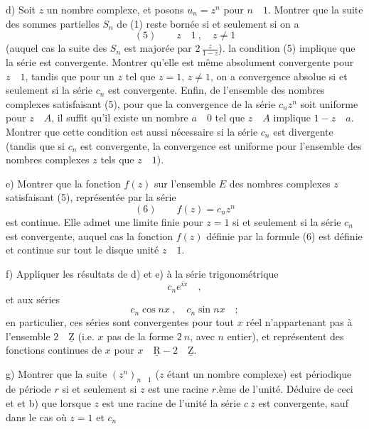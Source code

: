d) Soit $z$ un nombre complexe, et posons $u_n=z^n$ pour $n\quad1$. Montrer que la suite des sommes partielles $S_n$ de (1) reste bornée si et seulement si on a
\[
(5)\qquad z\quad1\ ,\quad z\ne1
\]
(auquel cas la suite des $S_n$ est majorée par $2\,\frac{z}{1-z}$).
 la condition (5) implique que la série  est convergente. Montrer qu'elle est même absolument convergente pour $z\quad1$, tandis que pour un $z$ tel que $z=1$, $z\ne1$, on a convergence absolue si et seulement si la  série $c_n$ est convergente. Enfin,
 de l'ensemble  des nombres complexes satisfaisant (5), pour que la convergence de la série $c_nz^n$ soit uniforme pour $z\quad A$, il suffit qu'il existe un nombre $a\quad0$ tel que $z\quad A$ implique $1-z\quad a$. Montrer que cette condition est aussi nécessaire si la série $c_n$ est divergente (tandis que si $c_n$ est convergente, la convergence est uniforme pour l'ensemble des nombres complexes $z$ tels que $z\quad1$). 

e) Montrer que la fonction $f(z)$ sur l'ensemble $E$ des nombres complexes $z$ satisfaisant (5), représentée par la série
\[
(6)\qquad f(z)=c_nz^n
\]
est continue. Elle admet une limite finie pour $z=1$ si et seulement si la  série $c_n$ est convergente, auquel cas la fonction $f(z)$ définie par la formule (6) est définie et continue  sur tout le disque unité $z\quad1$.

f) Appliquer les résultats de d) et e) à la série trigonométrique
\[
c_ne^{ix}\quad,
\]
et aux séries
\[
c_n\cos nx\ ,\quad c_n\sin nx\quad;
\]
en particulier, ces séries sont convergentes pour tout $x$ réel n'appartenant pas à l'ensemble  $2\quad\underline{\mathrm Z}$ (i.e. $x$ pas de la forme $2\ n$, avec $n$ entier), et représentent des fonctions continues de $x$ pour $x\quad\underline{\mathrm R}-2\quad\underline{\mathrm Z}$.

g) Montrer que la suite $(z^n)_{n\quad1}$ ($z$ étant un nombre complexe) est périodique de période $r$ si et seulement si $z$ est une racine $r$.ème de l'unité.  Déduire de ceci et et b) que lorsque $z$ est une racine de l'unité la série  $c\ z$ est convergente, sauf dans le cas où $z=1$ et $c_n$ 

